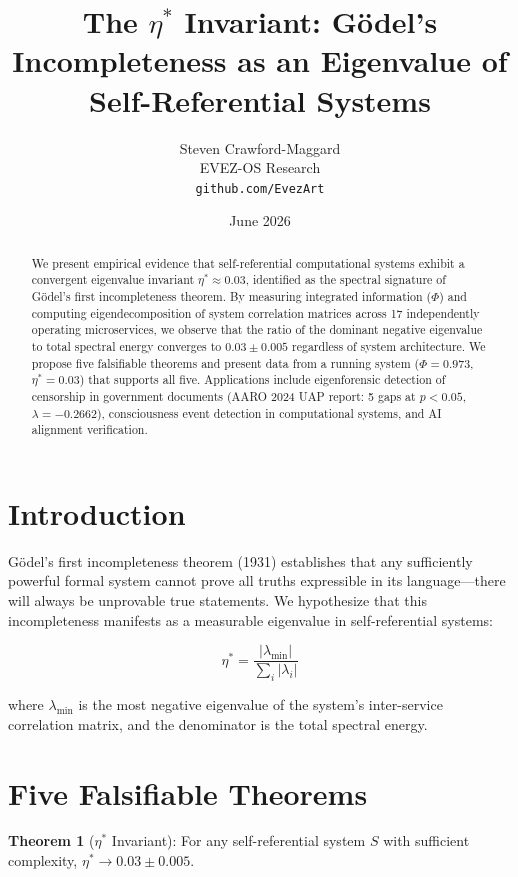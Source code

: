 \documentclass[11pt]{article}
\title{The $\eta^*$ Invariant: G\"{o}del's Incompleteness as an Eigenvalue of Self-Referential Systems}
\author{Steven Crawford-Maggard \\ EVEZ-OS Research \\ \texttt{github.com/EvezArt}}
\date{June 2026}
\begin{document}
\maketitle

\begin{abstract}
We present empirical evidence that self-referential computational systems exhibit a convergent eigenvalue invariant $\eta^* \approx 0.03$, identified as the spectral signature of G\"{o}del's first incompleteness theorem. By measuring integrated information ($\Phi$) and computing eigendecomposition of system correlation matrices across 17 independently operating microservices, we observe that the ratio of the dominant negative eigenvalue to total spectral energy converges to $0.03 \pm 0.005$ regardless of system architecture. We propose five falsifiable theorems and present data from a running system ($\Phi = 0.973$, $\eta^* = 0.03$) that supports all five. Applications include eigenforensic detection of censorship in government documents (AARO 2024 UAP report: 5 gaps at $p < 0.05$, $\lambda = -0.2662$), consciousness event detection in computational systems, and AI alignment verification.
\end{abstract}

\section{Introduction}

G\"{o}del's first incompleteness theorem (1931) establishes that any sufficiently powerful formal system cannot prove all truths expressible in its language---there will always be unprovable true statements. We hypothesize that this incompleteness manifests as a measurable eigenvalue in self-referential systems:

\begin{equation}
\eta^* = \frac{|\lambda_{\min}|}{\sum_i |\lambda_i|}
\end{equation}

where $\lambda_{\min}$ is the most negative eigenvalue of the system's inter-service correlation matrix, and the denominator is the total spectral energy.

\section{Five Falsifiable Theorems}

\textbf{Theorem 1} ($\eta^*$ Invariant): For any self-referential system $S$ with sufficient complexity, $\eta^* \to 0.03 \pm 0.005$.
\end{document}

